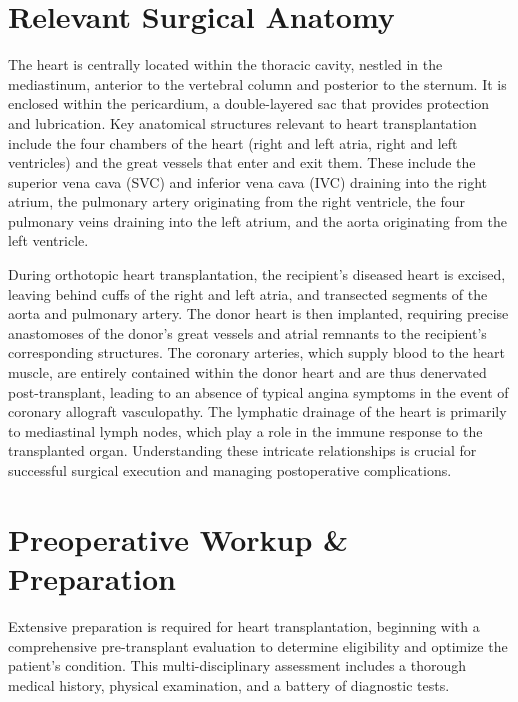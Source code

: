 \section*{Relevant Surgical Anatomy}
The heart is centrally located within the thoracic cavity, nestled in the mediastinum, anterior to the vertebral column and posterior to the sternum. It is enclosed within the pericardium, a double-layered sac that provides protection and lubrication. Key anatomical structures relevant to heart transplantation include the four chambers of the heart (right and left atria, right and left ventricles) and the great vessels that enter and exit them. These include the superior vena cava (SVC) and inferior vena cava (IVC) draining into the right atrium, the pulmonary artery originating from the right ventricle, the four pulmonary veins draining into the left atrium, and the aorta originating from the left ventricle.

During orthotopic heart transplantation, the recipient's diseased heart is excised, leaving behind cuffs of the right and left atria, and transected segments of the aorta and pulmonary artery. The donor heart is then implanted, requiring precise anastomoses of the donor's great vessels and atrial remnants to the recipient's corresponding structures. The coronary arteries, which supply blood to the heart muscle, are entirely contained within the donor heart and are thus denervated post-transplant, leading to an absence of typical angina symptoms in the event of coronary allograft vasculopathy. The lymphatic drainage of the heart is primarily to mediastinal lymph nodes, which play a role in the immune response to the transplanted organ. Understanding these intricate relationships is crucial for successful surgical execution and managing postoperative complications.

\section*{Preoperative Workup \& Preparation}
Extensive preparation is required for heart transplantation, beginning with a comprehensive pre-transplant evaluation to determine eligibility and optimize the patient's condition. This multi-disciplinary assessment includes a thorough medical history, physical examination, and a battery of diagnostic tests.

